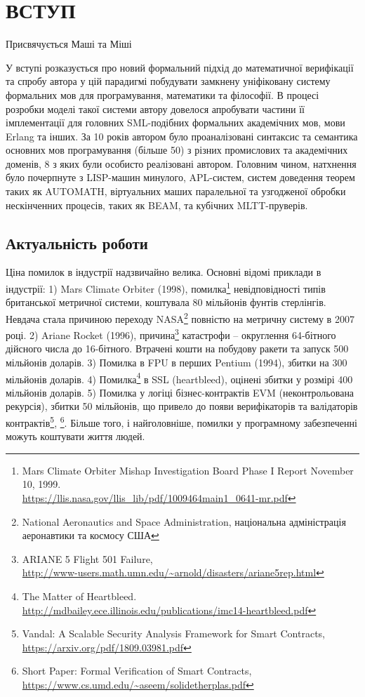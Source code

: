 \chapter*{ВСТУП}

\epigraph{Присвячується Маші та Міші}{}

У вступі розказується про новий формальний підхід до математичної верифікації та спробу автора
у цій парадигмі побудувати замкнену уніфіковану систему формальних мов для
програмування, математики та філософії. В процесі розробки моделі такої системи автору
довелося апробувати частини її імплементації для головних SML-подібних формальних академічних мов, мови Erlang та інших.
За 10 років автором було проаналізовані синтаксис та семантика основних
мов програмування (більше 50) з різних промислових та академічних доменів, 8 з яких були особисто реалізовані автором.
Головним чином, натхнення було почерпнуте з LISP-машин минулого, APL-систем,
систем доведення теорем таких як AUTOMATH, віртуальних маших паралельної
та узгодженої обробки нескінченних процесів, таких як BEAM, та кубічних MLTT-пруверів.

\section{Актуальність роботи}
Ціна помилок в індустрії надзвичайно велика. Основні відомі приклади в індустрії:
1) Mars Climate Orbiter (1998),
   помилка\footnote{Mars Climate Orbiter Mishap Investigation Board Phase I Report November 10, 1999. \\
                    \url{https://llis.nasa.gov/llis_lib/pdf/1009464main1_0641-mr.pdf}}
   невідповідності типів британської метричної системи, коштувала 80 мільйонів фунтів стерлінгів.
   Невдача стала причиною переходу
   NASA\footnote{National Aeronautics and Space Administration, національна адміністрація аеронавтики та космосу США}
   повністю на метричну систему в 2007 році.
2) Ariane Rocket (1996),
   причина\footnote{ARIANE 5 Flight 501 Failure, \\
          \url{http://www-users.math.umn.edu/~arnold/disasters/ariane5rep.html}}
   катастрофи -- округлення 64-бітного дійсного числа до 16-бітного.
   Втрачені кошти на побудову ракети та запуск 500 мільйонів доларів.
3) Помилка в FPU в перших Pentium (1994), збитки на 300 мільйонів доларів.
4) Помилка\footnote{The Matter of Heartbleed. \\
                    \url{http://mdbailey.ece.illinois.edu/publications/imc14-heartbleed.pdf}}
   в SSL (heartbleed), оцінені збитки у розмірі 400 мільйонів доларів.
5) Помилка у логіці бізнес-контрактів EVM (неконтрольована рекурсія), збитки 50 мільйонів,
   що привело до появи верифікаторів та валідаторів
   контрактів\footnote{Vandal: A Scalable Security Analysis Framework for Smart Contracts, \\
                       \url{https://arxiv.org/pdf/1809.03981.pdf}},
             \footnote{Short Paper: Formal Verification of Smart Contracts, \\
                       \url{https://www.cs.umd.edu/~aseem/solidetherplas.pdf}}.
Більше того, і найголовніше, помилки у програмному забезпеченні можуть коштувати життя людей.

